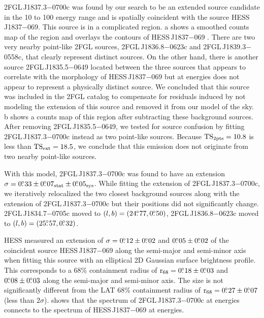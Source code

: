 2FGL\,J1837.3$-$0700c was found by our search to be an extended source
candidate in the 10 \gev to 100 \gev energy range and is spatially
coincident with the \tev source HESS\,J1837$-$069.  This source
is in a complicated region.  a shows a
smoothed counts map of the region and overlays the \tev contours of
HESS\,J1837$-$069 \citep{aharonian_2006a_h.e.s.s.-survey}.  There
are two very nearby point-like 2FGL sources, 2FGL\,J1836.8$-$0623c
and 2FGL\,J1839.3$-$0558c, that clearly represent distinct sources.
On the other hand, there is another source 2FGL\,J1835.5$-$0649 located
between the three sources that appears to correlate with the \tev
morphology of HESS\,J1837$-$069 but at \gev energies does not appear
to represent a physically distinct source.  We concluded that this
source was included in the 2FGL catalog to compensate for residuals
induced by not modeling the extension of this source and removed
it from our model of the sky.  b shows a
counts map of this region after subtracting these background sources.
After removing 2FGL\,J1835.5$-$0649, we tested for source confusion
by fitting 2FGL\,J1837.3$-$0700c instead as two point-like sources.
Because $\mathrm{TS}_{\mathrm{2pts}}=10.8$ is less than $\mathrm{TS}_\mathrm{ext}=18.5$, we conclude that this
emission does not originate from two nearby point-like sources.

With this model, 2FGL\,J1837.3$-$0700c was found to have an extension
$\sigma=0\mbox{$.\!\!^\circ$}33\pm0\mbox{$.\!\!^\circ$}07_\text{stat}\pm0\mbox{$.\!\!^\circ$}05_\text{sys}$.  While fitting
the extension of 2FGL\,J1837.3$-$0700c, we iteratively relocalized
the two closest background sources along with the extension of
2FGL\,J1837.3$-$0700c but their positions did not significantly
change.  2FGL\,J1834.7$-$0705c moved to $(l,b)=(24\mbox{$.\!\!^\circ$}77,0\mbox{$.\!\!^\circ$}50)$,
2FGL\,J1836.8$-$0623c moved to $(l,b)=(25\mbox{$.\!\!^\circ$}57,0\mbox{$.\!\!^\circ$}32)$.

\ac{HESS} measured an extension of $\sigma=0\mbox{$.\!\!^\circ$}12\pm0\mbox{$.\!\!^\circ$}02$ and
$0\mbox{$.\!\!^\circ$}05\pm0\mbox{$.\!\!^\circ$}02$ of the coincident \tev source HESS\,J1837$-$069
along the semi-major and semi-minor axis when fitting this source with
an elliptical 2D Gaussian surface brightness profile.  This corresponds
to a 68\% containment radius of ${\mathrm{r}_{68}}=0\mbox{$.\!\!^\circ$}18\pm0\mbox{$.\!\!^\circ$}03$ and
$0\mbox{$.\!\!^\circ$}08\pm0\mbox{$.\!\!^\circ$}03$ along the semi-major and semi-minor axis. The size
is not significantly different from the LAT 68\% containment radius of
${\mathrm{r}_{68}}=0\mbox{$.\!\!^\circ$}27\pm0\mbox{$.\!\!^\circ$}07$ (less than $2\sigma$).  
shows that the spectrum of 2FGL\,J1837.3$-$0700c at \gev energies connects
to the spectrum of HESS\,J1837$-$069 at \tev energies.

